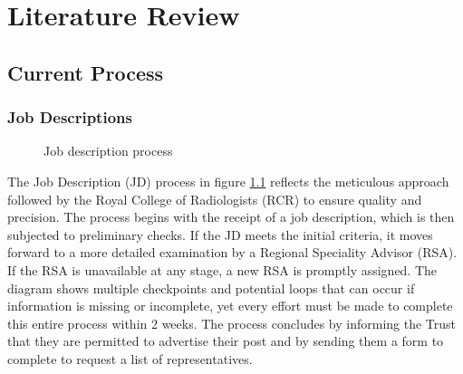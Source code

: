 \chapter{Literature Review} \label{Literature}
\section{Current Process}
\subsection{Job Descriptions}
\begin{figure}[h]
\centering
{}
\vspace{-20pt}
\caption{Job description process}
\label{fig:jd}
\end{figure}
\vspace{-5pt}
The Job Description (JD) process in figure \ref{fig:jd} reflects the meticulous approach followed by the Royal College of Radiologists (RCR) to ensure quality and precision. The process begins with the receipt of a job description, which is then subjected to preliminary checks. If the JD meets the initial criteria, it moves forward to a more detailed examination by a Regional Speciality Advisor (RSA). If the RSA is unavailable at any stage, a new RSA is promptly assigned. The diagram shows multiple checkpoints and potential loops that can occur if information is missing or incomplete, yet every effort must be made to complete this entire process within 2 weeks. The process concludes by informing the Trust that they are permitted to advertise their post and by sending them a form to complete to request a list of representatives.

